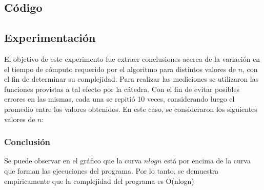     \subsection{Código}


    \subsection{Experimentación}
		El objetivo de este experimento fue extraer conclusiones acerca de la variación en el tiempo de cómputo requerido por el algoritmo para distintos valores de $n$, con el fin de determinar su complejidad. 
		Para realizar las mediciones se  utilizaron las funciones provistas a tal efecto por la cátedra. Con el fin de evitar posibles errores en las mismas, cada una se repitió 10 veces, considerando luego el promedio entre los valores obtenidos.
		En este caso, se consideraron los siguientes valores de $n$: 


		\subsubsection*{Conclusión}
			Se puede observar en el gráfico que la curva $n log n$ está por encima de la curva que forman las ejecuciones del programa. Por lo tanto, se demuestra empiricamente que la complejidad del programa es O(nlogn)
